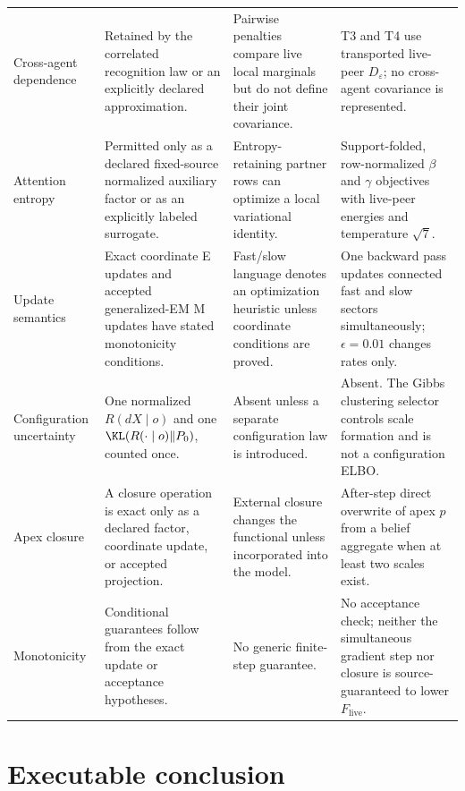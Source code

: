 \begin{longtable}{>{\raggedright\arraybackslash}p{}>{\raggedright\arraybackslash}p{}>{\raggedright\arraybackslash}p{}>{\raggedright\arraybackslash}p{}}
Cross-agent dependence & Retained by the correlated recognition law or an explicitly declared approximation. & Pairwise penalties compare live local marginals but do not define their joint covariance. & T3 and T4 use transported live-peer $D_\varepsilon$; no cross-agent covariance is represented. \\
Attention entropy & Permitted only as a declared fixed-source normalized auxiliary factor or as an explicitly labeled surrogate. & Entropy-retaining partner rows can optimize a local variational identity. & Support-folded, row-normalized $\beta$ and $\gamma$ objectives with live-peer energies and temperature $\sqrt7$. \\
Update semantics & Exact coordinate E updates and accepted generalized-EM M updates have stated monotonicity conditions. & Fast/slow language denotes an optimization heuristic unless coordinate conditions are proved. & One backward pass updates connected fast and slow sectors simultaneously; $\epsilon=0.01$ changes rates only. \\
Configuration uncertainty & One normalized $R(dX\mid o)$ and one $\KL(R(\mathord\cdot\mid o)\Vert P_0)$, counted once. & Absent unless a separate configuration law is introduced. & Absent. The Gibbs clustering selector controls scale formation and is not a configuration ELBO. \\
Apex closure & A closure operation is exact only as a declared factor, coordinate update, or accepted projection. & External closure changes the functional unless incorporated into the model. & After-step direct overwrite of apex $p$ from a belief aggregate when at least two scales exist. \\
Monotonicity & Conditional guarantees follow from the exact update or acceptance hypotheses. & No generic finite-step guarantee. & No acceptance check; neither the simultaneous gradient step nor closure is source-guaranteed to lower $F_{\mathrm{live}}$. \\
\bottomrule
\end{longtable}

\section{Executable conclusion}

